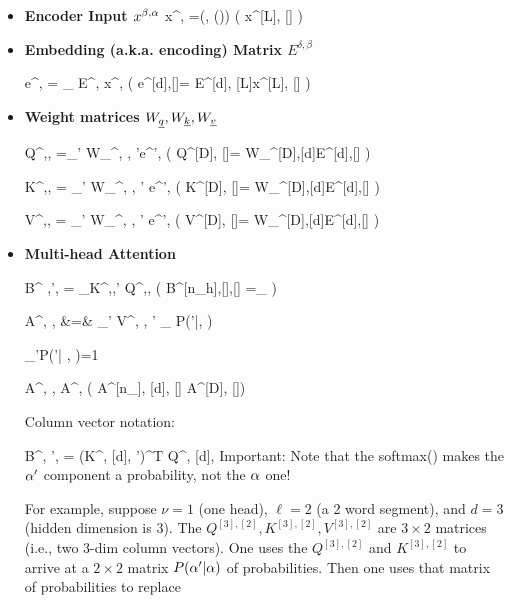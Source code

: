  
 \begin{itemize}
 
 \item {\bf Encoder Input $x^{\beta, \alpha}$}
 \beq
 x^{\beta, \alp} =\delta(\beta, \beta(\alp))
 \left(
 x^{[L], [\ell]} 
 \right)
 \eeq

\item {\bf Embedding (a.k.a. encoding) Matrix $E^{\delta, \beta}$}

\beq
e^{\delta, \alp} = \sum_\beta 
E^{\delta, \beta}
x^{\beta, \alp}
\;\;
\left(
e^{[d],[\ell]}= E^{[d], [L]}x^{[L], [\ell]}
\right)
\eeq

\item{\bf Weight matrices $W_{\underline{q}}, W_{\underline{k}}, W_{\underline{v}}$}

\beq
Q^{\nu,\delta, \alp}=\sum_{\delta'}
W_\rvq^{\nu, \delta, \delta'}e^{\delta', \alp}
\;\;
\left(
Q^{[D], [\ell]}=
W_\rvq^{[D],[d]}E^{[d],[\ell]}
\right)
\eeq


\beq
K^{\nu,\delta, \alp}=
\sum_{\delta'}
W_\rvk^{\nu, \delta, \delta'}
e^{\delta', \alp}
\;\;
\left(
K^{[D], [\ell]}=
W_\rvk^{[D],[d]}E^{[d],[\ell]}
\right)
\eeq

\beq
V^{\nu,\delta, \alp}=
\sum_{\delta'}
W_\rvv^{\nu, \delta, \delta'}
e^{\delta', \alp}
\;\;
\left(
V^{[D], [\ell]}=
W_\rvv^{[D],[d]}E^{[d],[\ell]}
\right)
\eeq

\item {\bf Multi-head Attention}

\beq
B^{
\nu,{\alp'}, \alp}=
\sum_\delta K^{\nu,\delta,{\alp'}}
Q^{\nu,\delta,\alp}
\;\;
\left(
B^{[n_h],[\ell],[\ell]}
=_{\nu\in[n_\rvh]}
\right)
\eeq

\beqa
A^{\nu, 
\delta, \alp}&=&
\sum_{{\alp'}}
V^{\nu, \delta, {\alp'}}
_{
P({\alp'}|\alp, \nu)}
\eeqa

\beq
\sum_{{\alp'}\in [\ell]}P({\alp'}| \alp, \nu)=1
\eeq

\beq
A^{\nu, \delta, \alp}
\rarrow
A^{\Delta, \alp}
\left(
A^{[n_\rvh], [d], [\ell]}
\rarrow
A^{[D], [\ell]}\right)
\eeq

Column vector notation:

\beq
B^{\nu, {\alp'}, \alp}=
(K^{\nu, [d], {\alp'}})^T Q^{\nu, [d], \alp}
\eeq
Important: Note that the softmax() makes the
${\alpha'}$ component a probability,
not the $\alpha$ one!

For example, suppose $\nu=1$ (one head), $\ell=2$ (a 2 word segment), 
and $d=3$ (hidden dimension is 3).
The $Q^{[3], [2]}, K^{[3], [2]}, V^{[3], [2]}$ are $3\times 2$ matrices
(i.e., two 3-dim column vectors).
One uses the $Q^{[3], [2]}$ and $K^{[3], [2]}$ to arrive at a 
$2\times 2$ matrix $P(\alpha'|\alpha)$
of probabilities.
Then one uses that matrix of probabilities to replace


\end{itemize}
